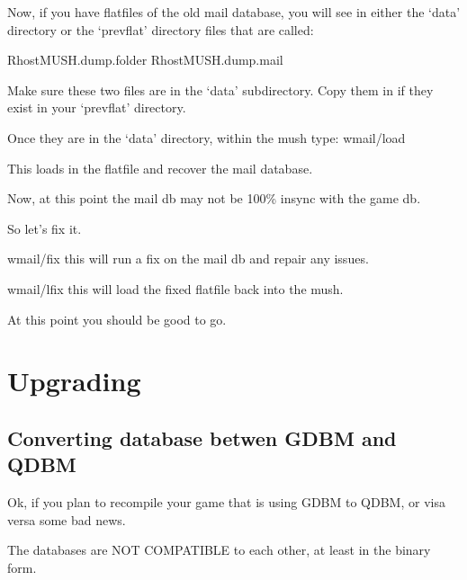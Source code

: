 \documentclass[letterpaper,10pt,english]{sphinxmanual}
\begin{document}
\sphinxAtStartPar
Now, if you have flatfiles of the old mail database, you will see in either
the ‘data’ directory or the ‘prevflat’ directory files that are called:

\sphinxAtStartPar
RhostMUSH.dump.folder
RhostMUSH.dump.mail

\sphinxAtStartPar
Make sure these two files are in the ‘data’ subdirectory.  Copy them in
if they exist in your ‘prevflat’ directory.

\sphinxAtStartPar
Once they are in the ‘data’ directory, within the mush type: wmail/load

\sphinxAtStartPar
This loads in the flatfile and recover the mail database.

\sphinxAtStartPar
Now, at this point the mail db may not be 100\% in\sphinxhyphen{}sync with the game db.

\sphinxAtStartPar
So let’s fix it.

\sphinxAtStartPar
wmail/fix   \textendash{} this will run a fix on the mail db and repair any issues.

\sphinxAtStartPar
wmail/lfix  \textendash{} this will load the fixed flatfile back into the mush.

\sphinxAtStartPar
At this point you should be good to go.


\section{Upgrading}
\label{\detokenize{upgrade:upgrading}}\label{\detokenize{upgrade::doc}}

\subsection{Converting database betwen GDBM and QDBM}
\label{\detokenize{upgrade:converting-database-betwen-gdbm-and-qdbm}}
\sphinxAtStartPar
Ok, if you plan to recompile your game that is using GDBM to QDBM, or visa versa
some bad news.

\sphinxAtStartPar
The databases are NOT COMPATIBLE to each other, at least in the binary form.
\end{document}
